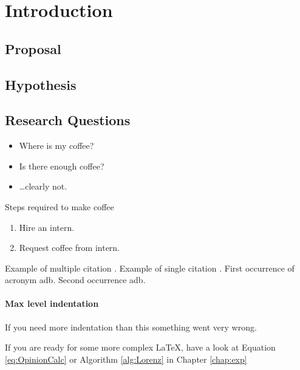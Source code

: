 
\chapter{Introduction}
\label{chap:intro}

\section{Proposal}
\label{sec:proposal}

\section{Hypothesis}
\label{sec:hype}


\section{Research Questions}
\label{sec:researchQuestions}


\begin{itemize}
    \item Where is my coffee?
    \item Is there enough coffee?
    \item \ldots clearly not.
\end{itemize}

Steps required to make coffee

\begin{enumerate}
    \item Hire an intern.
    \item Request coffee from intern.
\end{enumerate}


Example of multiple citation \cite{maslow1970,Axelrod1981}. Example of single citation \cite{Dellarocas2007}. First occurrence of acronym \gls{adb}. Second occurrence \gls{adb}.

\subsubsection{Max level indentation}
If you need more indentation than this something went very wrong.

If you are ready for some more complex \LaTeX, have a look at Equation \ref{eq:OpinionCalc} or Algorithm \ref{alg:Lorenz} in Chapter \ref{chap:exp}
